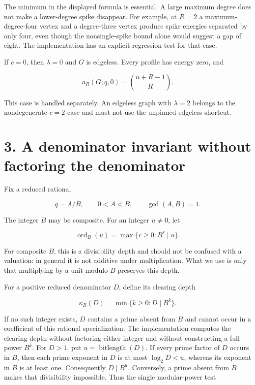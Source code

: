 \documentclass[
  11pt,
  a4paper,
]{report}
\begin{document}
The minimum in the displayed formula is essential. A large maximum
degree does not make a lower-degree spike disappear. For example, at
\(R=2\) a maximum-degree-four vertex and a degree-three vertex produce
spike energies separated by only four, even though the nonsingle-spike
bound alone would suggest a gap of eight. The implementation has an
explicit regression test for that case.

If \(c=0\), then \(\lambda=0\) and \(G\) is edgeless. Every profile has
energy zero, and

\[
a_R(G;q,0)=\binom{n+R-1}{R}.
\]

This case is handled separately. An edgeless graph with \(\lambda=2\)
belongs to the nondegenerate \(c=2\) case and must not use the unpinned
edgeless shortcut.

\hypertarget{a-denominator-invariant-without-factoring-the-denominator}{%
\section{3. A denominator invariant without factoring the
denominator}\label{a-denominator-invariant-without-factoring-the-denominator}}

Fix a reduced rational

\[
q=A/B,\qquad 0<A<B,\qquad \gcd(A,B)=1.
\]

The integer \(B\) may be composite. For an integer \(u\ne0\), let

\[
\operatorname{ord}_B(u)=\max\{r\ge0:B^r\mid u\}.
\]

For composite \(B\), this is a divisibility depth and should not be
confused with a valuation: in general it is not additive under
multiplication. What we use is only that multiplying by a unit modulo
\(B\) preserves this depth.

For a positive reduced denominator \(D\), define its clearing depth

\[
\kappa_B(D)=\min\{k\ge0:D\mid B^k\}.
\]

If no such integer exists, \(D\) contains a prime absent from \(B\) and
cannot occur in a coefficient of this rational specialization. The
implementation computes the clearing depth without factoring either
integer and without constructing a full power \(B^k\). For \(D>1\), put
\(u=\operatorname{bitlength}(D)\). If every prime factor of \(D\) occurs
in \(B\), then each prime exponent in \(D\) is at most \(\log_2 D<u\),
whereas its exponent in \(B\) is at least one. Consequently
\(D\mid B^u\). Conversely, a prime absent from \(B\) makes that
divisibility impossible. Thus the single modular-power test
\end{document}
